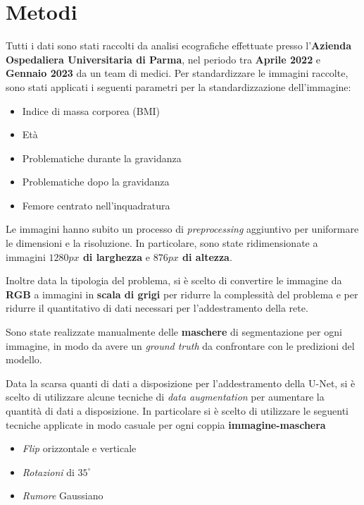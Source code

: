 \chapter{Metodi} %
\label{cha:Metodi}

Tutti i dati sono stati raccolti da analisi ecografiche effettuate presso l'\textbf{Azienda
	Ospedaliera Universitaria di Parma}, nel periodo tra \textbf{Aprile 2022} e \textbf{Gennaio 2023} da
un team di medici. Per standardizzare le immagini raccolte, sono stati applicati i
seguenti parametri per la standardizzazione dell'immagine:

\begin{itemize}
	\item Indice di massa corporea (BMI)
	\item Età
	\item Problematiche durante la gravidanza
	\item Problematiche dopo la gravidanza
	\item Femore centrato nell'inquadratura
\end{itemize}

Le immagini hanno subito un processo di \textit{preprocessing} aggiuntivo per
uniformare le dimensioni e la risoluzione. In particolare, sono state
ridimensionate a immagini \textbf{$1280px$ di larghezza} e \textbf{$876px$ di
	altezza}.

Inoltre data la tipologia del problema, si è scelto di convertire le immagine da
\textbf{RGB} a immagini in \textbf{scala di grigi} per ridurre la complessità del problema
e per ridurre il quantitativo di dati necessari per l'addestramento della rete.

Sono state realizzate manualmente delle \textbf{maschere} di segmentazione per
ogni immagine, in modo da avere un \textit{ground truth} da confrontare con le
predizioni del modello.

Data la scarsa quanti di dati a disposizione per l'addestramento della U-Net, si è scelto
di utilizzare alcune tecniche di \textit{data augmentation} per aumentare la quantità di
dati a disposizione. In particolare si è scelto di utilizzare le seguenti tecniche
applicate in modo casuale per ogni coppia \textbf{immagine-maschera}
\begin{itemize}
	\item \textit{Flip} orizzontale e verticale
	\item \textit{Rotazioni} di $35^{\circ}$
	\item \textit{Rumore} Gaussiano
\end{itemize}

